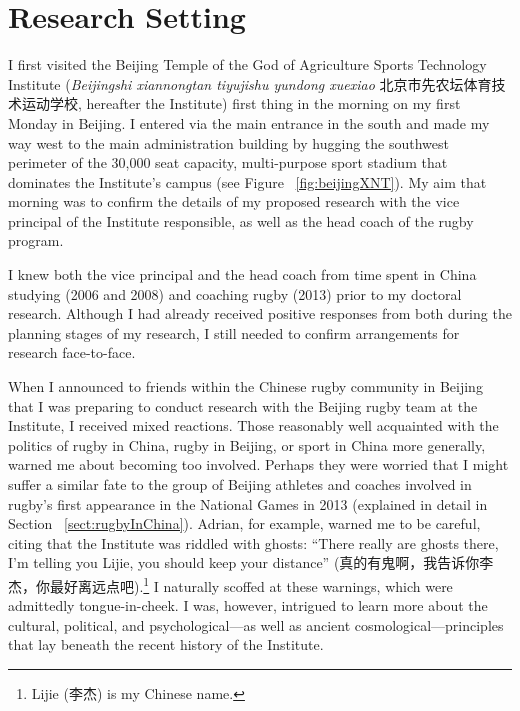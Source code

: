 
\begin{savequote}[8cm]

  \qauthor{}
\end{savequote}


\chapter{\label{chap:researchSetting}Research Setting}


\minitoc




                                  \begin{CJK}{UTF8}{gbsn}


I first visited the Beijing Temple of the God of Agriculture Sports Technology Institute (\textit{Beijingshi xiannongtan tiyujishu yundong xuexiao} 北京市先农坛体育技术运动学校,
hereafter the Institute) first thing in the morning on my first Monday in Beijing.  I entered via the main entrance in the south and made my way west to the main administration building by hugging the southwest perimeter of the 30,000 seat capacity, multi-purpose sport stadium that dominates the Institute's campus (see Figure ~\ref{fig:beijingXNT}). My aim that morning was to confirm the details of my proposed research with the vice principal of the Institute responsible, as well as the head coach of the rugby program.

I knew both the vice principal and the head coach from time spent in China studying (2006 and 2008) and coaching rugby (2013) prior to my doctoral research.  Although I had already received positive responses from both during the planning stages of my research, I still needed to confirm arrangements for research face-to-face.

When I announced to friends within the Chinese rugby community in Beijing that I was preparing to conduct research with the Beijing rugby team at the Institute, I received mixed reactions.  Those reasonably well acquainted with the politics of rugby in China, rugby in Beijing, or sport in China more generally, warned me about becoming too involved.  Perhaps they were worried that I might suffer a similar fate to the group of Beijing athletes and coaches involved in rugby's first appearance in the National Games in 2013 (explained in detail in Section ~\ref{sect:rugbyInChina}).  Adrian, for example, warned me to be careful, citing that the Institute was riddled with ghosts: ``There really are ghosts there, I'm telling you Lijie, you should keep your distance'' (真的有鬼啊，我告诉你李杰，你最好离远点吧).\footnote{Lijie (李杰) is my Chinese name.}  I naturally scoffed at these warnings, which were admittedly tongue-in-cheek.  I was, however, intrigued to learn more about the cultural, political, and psychological---as well as ancient cosmological---principles that lay beneath the recent history of the Institute.


\end{CJK}
